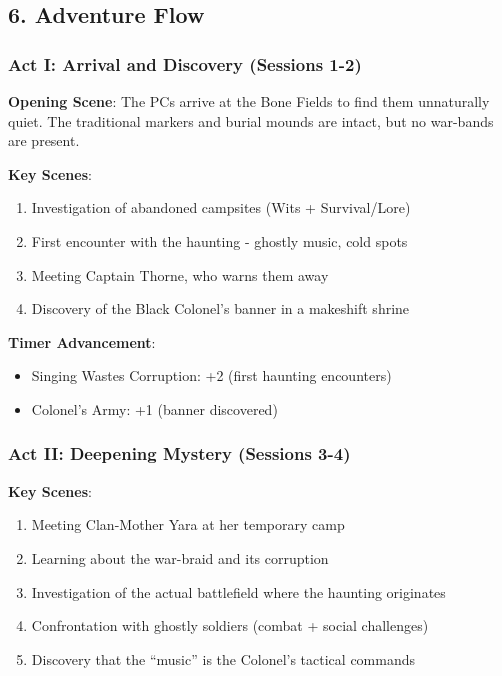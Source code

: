 \documentclass[11pt]{article}
\begin{document}
\subsection*{6. Adventure Flow}

\subsubsection*{Act I: Arrival and Discovery (Sessions 1-2)}

\textbf{Opening Scene}: The PCs arrive at the Bone Fields to find them unnaturally quiet. The traditional markers and burial mounds are intact, but no war-bands are present.

\textbf{Key Scenes}:
\begin{enumerate}[leftmargin=*]
\item Investigation of abandoned campsites (Wits + Survival/Lore)
\item First encounter with the haunting - ghostly music, cold spots
\item Meeting Captain Thorne, who warns them away
\item Discovery of the Black Colonel's banner in a makeshift shrine
\end{enumerate}

\textbf{Timer Advancement}: 
\begin{itemize}[leftmargin=*]
\item Singing Wastes Corruption: +2 (first haunting encounters)
\item Colonel's Army: +1 (banner discovered)
\end{itemize}

\subsubsection*{Act II: Deepening Mystery (Sessions 3-4)}

\textbf{Key Scenes}:
\begin{enumerate}[leftmargin=*]
\item Meeting Clan-Mother Yara at her temporary camp
\item Learning about the war-braid and its corruption
\item Investigation of the actual battlefield where the haunting originates
\item Confrontation with ghostly soldiers (combat + social challenges)
\item Discovery that the ``music'' is the Colonel's tactical commands
\end{enumerate}
\end{document}
